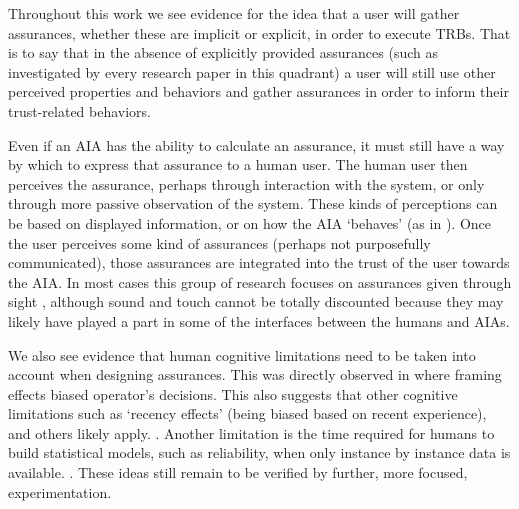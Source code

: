 Throughout this work we see evidence for the idea that a user will gather assurances, whether these are implicit or explicit, in order to execute TRBs. That is to say that in the absence of explicitly provided assurances (such as investigated by every research paper in this quadrant) a user will still use other perceived properties and behaviors and gather assurances in order to inform their trust-related behaviors.

Even if an AIA has the ability to calculate an assurance, it must still have a way by which to express that assurance to a human user. The human user then perceives the assurance, perhaps through interaction with the system, or only through more passive observation of the system. These kinds of perceptions can be based on displayed information, or on how the AIA `behaves' (as in \cite{Salem2015-md}). Once the user perceives some kind of assurances (perhaps not purposefully communicated), those assurances are integrated into the trust of the user towards the AIA. In most cases this group of research focuses on assurances given through sight , although sound and touch cannot be totally discounted because they may likely have played a part in some of the interfaces between the humans and AIAs. 

We also see evidence that human cognitive limitations need to be taken into account when designing assurances. This was directly observed in \cite{Freedy2007-sg,Riley1996-qm} where framing effects biased operator's decisions. This also suggests that other cognitive limitations such as `recency effects' (being biased based on recent experience), and others likely apply. . Another limitation is the time required for humans to build statistical models, such as reliability, when only instance by instance data is available. . These ideas still remain to be verified by further, more focused, experimentation.
%
